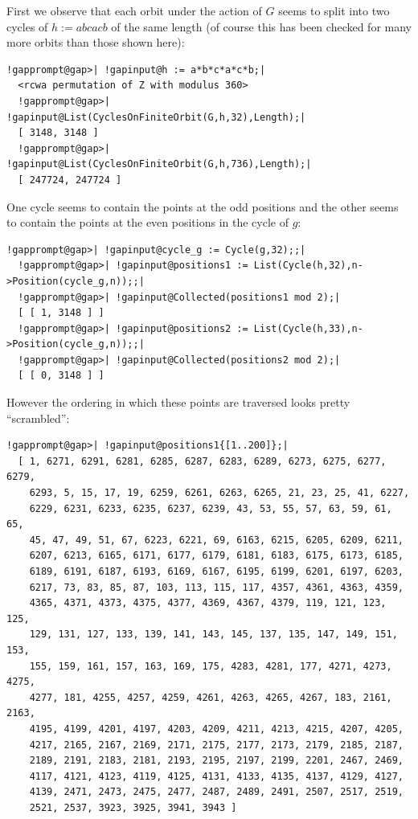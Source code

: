 \documentclass[a4paper,11pt]{report}
\begin{document}
{{ First we observe that each orbit under the action of $G$ seems to split into two cycles of $h := abcacb$ of the same length (of course this has been checked for many more orbits than
those shown here): 
\begin{Verbatim}[commandchars=!@|,fontsize=\small,frame=single,label=Example]
  !gapprompt@gap>| !gapinput@h := a*b*c*a*c*b;|
  <rcwa permutation of Z with modulus 360>
  !gapprompt@gap>| !gapinput@List(CyclesOnFiniteOrbit(G,h,32),Length);|
  [ 3148, 3148 ]
  !gapprompt@gap>| !gapinput@List(CyclesOnFiniteOrbit(G,h,736),Length);|
  [ 247724, 247724 ]
\end{Verbatim}
 One cycle seems to contain the points at the odd positions and the other seems
to contain the points at the even positions in the cycle of $g$: 
\begin{Verbatim}[commandchars=!@|,fontsize=\small,frame=single,label=Example]
  !gapprompt@gap>| !gapinput@cycle_g := Cycle(g,32);;|
  !gapprompt@gap>| !gapinput@positions1 := List(Cycle(h,32),n->Position(cycle_g,n));;|
  !gapprompt@gap>| !gapinput@Collected(positions1 mod 2);|
  [ [ 1, 3148 ] ]
  !gapprompt@gap>| !gapinput@positions2 := List(Cycle(h,33),n->Position(cycle_g,n));;|
  !gapprompt@gap>| !gapinput@Collected(positions2 mod 2);|
  [ [ 0, 3148 ] ]
\end{Verbatim}
 However the ordering in which these points are traversed looks pretty ``scrambled'': 
\begin{Verbatim}[commandchars=!@|,fontsize=\small,frame=single,label=Example]
  !gapprompt@gap>| !gapinput@positions1{[1..200]};|
  [ 1, 6271, 6291, 6281, 6285, 6287, 6283, 6289, 6273, 6275, 6277, 6279, 
    6293, 5, 15, 17, 19, 6259, 6261, 6263, 6265, 21, 23, 25, 41, 6227, 
    6229, 6231, 6233, 6235, 6237, 6239, 43, 53, 55, 57, 63, 59, 61, 65, 
    45, 47, 49, 51, 67, 6223, 6221, 69, 6163, 6215, 6205, 6209, 6211, 
    6207, 6213, 6165, 6171, 6177, 6179, 6181, 6183, 6175, 6173, 6185, 
    6189, 6191, 6187, 6193, 6169, 6167, 6195, 6199, 6201, 6197, 6203, 
    6217, 73, 83, 85, 87, 103, 113, 115, 117, 4357, 4361, 4363, 4359, 
    4365, 4371, 4373, 4375, 4377, 4369, 4367, 4379, 119, 121, 123, 125, 
    129, 131, 127, 133, 139, 141, 143, 145, 137, 135, 147, 149, 151, 153, 
    155, 159, 161, 157, 163, 169, 175, 4283, 4281, 177, 4271, 4273, 4275, 
    4277, 181, 4255, 4257, 4259, 4261, 4263, 4265, 4267, 183, 2161, 2163, 
    4195, 4199, 4201, 4197, 4203, 4209, 4211, 4213, 4215, 4207, 4205, 
    4217, 2165, 2167, 2169, 2171, 2175, 2177, 2173, 2179, 2185, 2187, 
    2189, 2191, 2183, 2181, 2193, 2195, 2197, 2199, 2201, 2467, 2469, 
    4117, 4121, 4123, 4119, 4125, 4131, 4133, 4135, 4137, 4129, 4127, 
    4139, 2471, 2473, 2475, 2477, 2487, 2489, 2491, 2507, 2517, 2519, 
    2521, 2537, 3923, 3925, 3941, 3943 ]
\end{Verbatim}
 }

}
\end{document}
